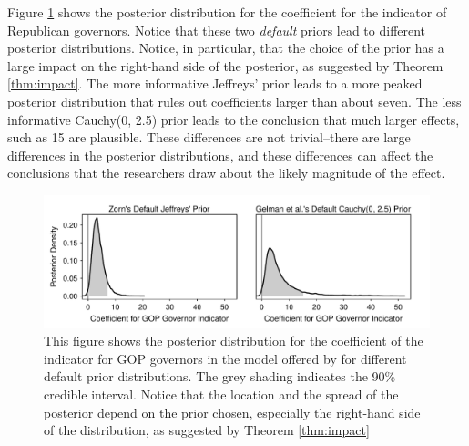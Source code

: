 \documentclass[12pt]{article}
\begin{document}
Figure \ref{fig:bf-posterior-density-illustrate-importance} shows the posterior distribution for the coefficient for the indicator of Republican governors. Notice that these two \emph{default} priors lead to different posterior distributions. Notice, in particular, that the choice of the prior has a large impact on the right-hand side of the posterior, as suggested by Theorem \ref{thm:impact}. The more informative Jeffreys' prior leads to a more peaked posterior distribution that rules out coefficients larger than about seven. The less informative Cauchy(0, 2.5) prior leads to the conclusion that much larger effects, such as 15 are plausible. These differences are not trivial--there are large differences in the posterior distributions, and these differences can affect the conclusions that the researchers draw about the likely magnitude of the effect.

\begin{figure}[H]
\begin{center}
\includegraphics[scale = .8]{figs/br-posterior-density-illustrate-importance.pdf}
\caption{This figure shows the posterior distribution for the coefficient of the indicator for GOP governors in the model offered by \cite{BarrilleauxRainey2014} for different default prior distributions. The grey shading indicates the 90\% credible interval. Notice that the location and the spread of the posterior depend on the prior chosen, especially the right-hand side of the distribution, as suggested by Theorem \ref{thm:impact}}\label{fig:bf-posterior-density-illustrate-importance}
\end{center}
\end{figure}
\end{document}
